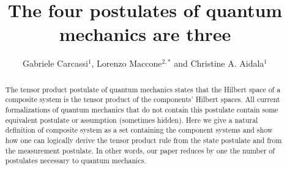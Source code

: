 \documentclass[aps,prl,amsmath,amssymb,twocolumn,nofootinbib]{revtex4}
\theoremstyle{plain}
\theoremstyle{definition}
\theoremstyle{remark}
\begin{document}
	
	\title{The four postulates of quantum mechanics are three}
	\author{Gabriele Carcassi$^1$, Lorenzo Maccone$^{2,*}$ and Christine A. Aidala$^1$
	}
	\begin{abstract}
		The tensor product postulate of quantum mechanics states that the
		Hilbert space of a composite system is the tensor product of the
		components' Hilbert spaces. All current formalizations of quantum
		mechanics that do not contain this postulate contain some equivalent
		postulate or assumption (sometimes hidden). Here we give a natural
		definition of composite system as a set containing the component
		systems and show how one can logically derive the tensor product
		rule from the state postulate and from the measurement postulate. In
		other words, our paper reduces by one the number of postulates
		necessary to quantum mechanics.
	\end{abstract}
	\pacs{}
	\maketitle
	
\end{document}
